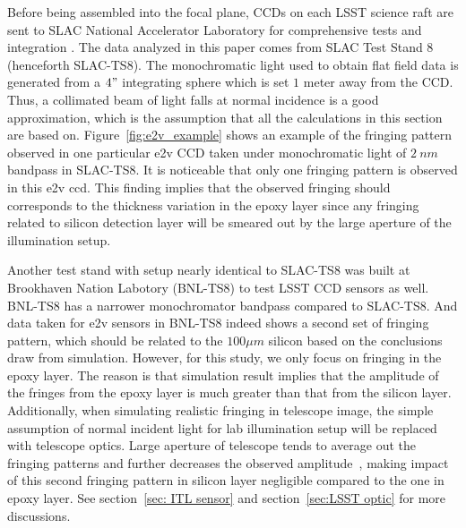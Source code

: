 \documentclass[twocolumn]{aastex63} %
\begin{document}
\begin{CJK*}{UTF8}{gbsn}
Before being assembled into the focal plane, CCDs on each LSST science raft are sent to SLAC National Accelerator Laboratory for comprehensive tests and integration \citep{Bond18,Ivezi19}. The data analyzed in this paper comes from SLAC Test Stand 8 (henceforth SLAC-TS8). The monochromatic light used to obtain flat field data is generated from a $4"$ integrating sphere which is set $1$ meter away from the CCD. Thus, a collimated beam of light falls at normal incidence is a good approximation, which is the assumption that all the calculations in this section are based on. Figure~\ref{fig:e2v_example} shows an example of the fringing pattern observed in one particular e2v CCD taken under monochromatic light of $2\ nm$ bandpass in SLAC-TS8. It is noticeable that only one fringing pattern is observed in this e2v ccd. This finding implies that the observed fringing should corresponds to the thickness variation in the epoxy layer since any fringing related to silicon detection layer will be smeared out by the large aperture of the illumination setup.

Another test stand with setup nearly identical to SLAC-TS8 was built at Brookhaven Nation Labotory (BNL-TS8) to test LSST CCD sensors as well. BNL-TS8 has a narrower monochromator bandpass compared to SLAC-TS8. And data taken for e2v sensors in BNL-TS8 indeed shows a second set of fringing pattern, which should be related to the $100\mu m$ silicon based on the conclusions draw from simulation. However, for this study, we only focus on fringing in the epoxy layer. The reason is that simulation result implies that the amplitude of the fringes from the epoxy layer is much greater than that from the silicon layer.  Additionally, when simulating realistic fringing in telescope image, the simple assumption of normal incident light for lab illumination setup will be replaced with telescope optics. Large aperture of telescope tends to average out the fringing patterns and further decreases the observed amplitude~\citep{Groom17}, making impact of this second fringing pattern in silicon layer negligible compared to the one in epoxy layer. See section~\ref{sec: ITL sensor} and section~\ref{sec:LSST optic} for more discussions. 



\end{CJK*}
\end{document}
